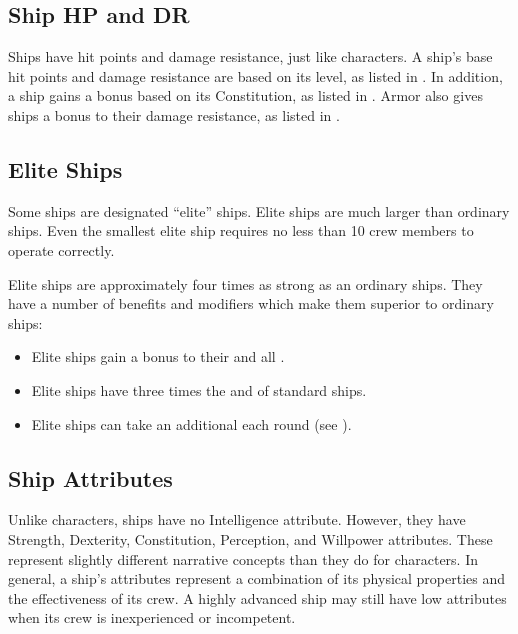     \subsection{Ship HP and DR}
        Ships have hit points and damage resistance, just like characters.
        A ship's base hit points and damage resistance are based on its level, as listed in .
        In addition, a ship gains a bonus based on its Constitution, as listed in .
        Armor also gives ships a bonus to their damage resistance, as listed in .

    \subsection{Elite Ships}\label{Elite Ships}
        Some ships are designated ``elite'' ships.
        Elite ships are much larger than ordinary ships.
        Even the smallest elite ship requires no less than 10 crew members to operate correctly.

        Elite ships are approximately four times as strong as an ordinary ships.
        They have a number of benefits and modifiers which make them superior to ordinary ships:
        \begin{itemize}
            \item Elite ships gain a  bonus to their  and all .
            \item Elite ships have three times the  and  of standard ships.
            \item Elite ships can take an additional  each round (see ).
        \end{itemize}

    \subsection{Ship Attributes}
        Unlike characters, ships have no Intelligence attribute.
        However, they have Strength, Dexterity, Constitution, Perception, and Willpower attributes.
        These represent slightly different narrative concepts than they do for characters.
        In general, a ship's attributes represent a combination of its physical properties and the effectiveness of its crew.
        A highly advanced ship may still have low attributes when its crew is inexperienced or incompetent.

